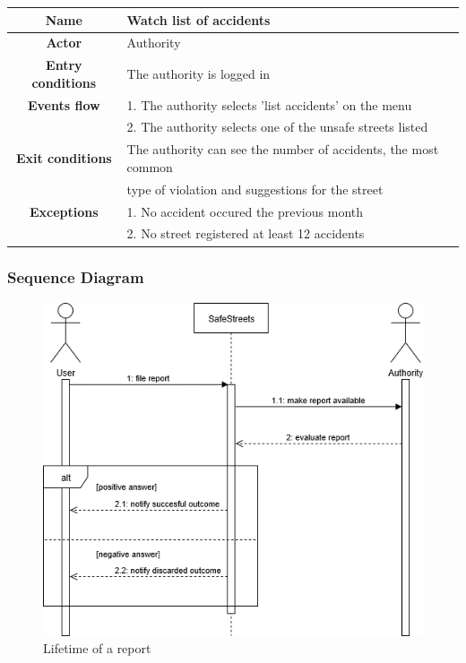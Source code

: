 \begin{flushleft}
\begin{tabular}{|c|l|}
\hline
\textbf{Name} & Watch list of accidents\\ \hline
\textbf{Actor} & Authority\\ \hline
\textbf{Entry conditions} & The authority is logged in\\ \hline
\textbf{Events flow} & 1. The authority selects 'list accidents' on the menu\\& 2. The authority selects one of the unsafe streets listed\\ \hline
\textbf{Exit conditions} & The authority can see the number of accidents, the most common\\& type of violation and suggestions for the street\\ \hline
\textbf{Exceptions} & 1. No accident occured the previous month\\& 2. No street registered at least 12 accidents\\
\hline 
\end{tabular}
\end{flushleft}

\subsubsection{Sequence Diagram}
\begin{figure}
[H]
\includegraphics[scale=0.5]{Images/Diagrams/Sequence1.png}
\caption{\label{fig:Sequence1}Lifetime of a report}
\end{figure}

